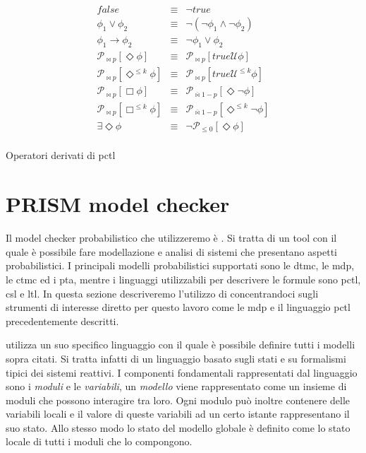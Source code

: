 \begin{table}[htbp!]
$$
\begin{array}{rcl}
	false & \equiv & \neg true \\
	\phi_1 \vee \phi_2 & \equiv & \neg(\neg\phi_1 \wedge \neg\phi_2) \\
	\phi_1 \rightarrow \phi_2 & \equiv & \neg\phi_1 \vee \phi_2 \\
	\mathcal{P}_{\bowtie p}[\Diamond \phi] & \equiv & \mathcal{P}_{\bowtie p}[true \mathcal{U} \phi] \\
	\mathcal{P}_{\bowtie p}[\Diamond^{\leq k} \phi] & \equiv & \mathcal{P}_{\bowtie p}[true \mathcal{U}^{\leq k} \phi] \\
	\mathcal{P}_{\bowtie p}[\Box \phi] & \equiv & \mathcal{P}_{\overline\bowtie 1-p}[\Diamond \neg \phi] \\
	\mathcal{P}_{\bowtie p}[\Box^{\leq k} \phi] & \equiv & \mathcal{P}_{\overline\bowtie 1-p}[\Diamond^{\leq k} \neg \phi] \\
	\exists\Diamond\phi & \equiv & \neg \mathcal{P}_{\leq 0}[\Diamond\phi] \\
\end{array}
$$
\caption{Operatori derivati di \acs{pctl}}
\label{tab:sintassi:derivati}
\end{table}

\section{PRISM model checker}
Il model checker probabilistico che utilizzeremo è \prism{} \cite{KNP11}. Si tratta di un tool con il quale è possibile fare modellazione e analisi di sistemi che presentano aspetti probabilistici. I principali modelli probabilistici supportati sono le \ac{dtmc}, le \ac{mdp}, le \ac{ctmc} ed i \ac{pta}, mentre i linguaggi utilizzabili per descrivere le formule sono \ac{pctl}, \ac{csl} e \ac{ltl}. In questa sezione descriveremo l'utilizzo di \prism{} concentrandoci sugli strumenti di interesse diretto per questo lavoro come le \ac{mdp} e il linguaggio \ac{pctl} precedentemente descritti.

\prism{} utilizza un suo specifico linguaggio con il quale è possibile definire tutti i modelli sopra citati. Si tratta infatti di un linguaggio basato sugli stati e su formalismi tipici dei sistemi reattivi. I componenti fondamentali rappresentati dal linguaggio sono i \emph{moduli} e le \emph{variabili}, un \emph{modello} viene rappresentato come un insieme di moduli che possono interagire tra loro. Ogni modulo può inoltre contenere delle variabili locali e il valore di queste variabili ad un certo istante rappresentano il suo stato. Allo stesso modo lo stato del modello globale è definito come lo stato locale di tutti i moduli che lo compongono.

